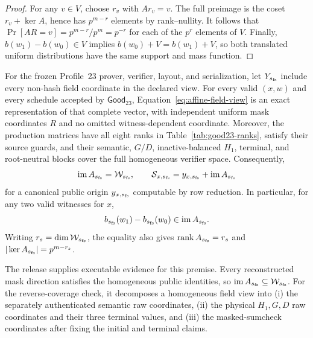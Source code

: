 \begin{proof}
For any \(v\in V\), choose \(r_v\) with \(Ar_v=v\).  The full preimage is
the coset \(r_v+\ker A\), hence has \(p^{m-r}\) elements by rank--nullity.
It follows that
\(
 \Pr[AR=v]=p^{m-r}/p^m=p^{-r}
\)
for each of the \(p^r\) elements of \(V\).  Finally,
\(b(w_1)-b(w_0)\in V\) implies
\(b(w_0)+V=b(w_1)+V\), so both translated uniform distributions have the
same support and mass function.
\end{proof}

\begin{assumption}
\label{lem:complete-affine-image}
For the frozen Profile~23 prover, verifier, layout, and serialization, let
\(Y_{s_{\rm fs}}\) include every non-hash field coordinate in the declared
view.  For every valid \((x,w)\) and every schedule accepted by
\(\mathsf{Good}_{23}\), Equation~\eqref{eq:affine-field-view} is an exact
representation of that complete vector, with independent uniform mask
coordinates \(R\) and no omitted witness-dependent coordinate.  Moreover, the
production matrices have all eight ranks in Table~\ref{tab:good23-ranks},
satisfy their source guards, and their semantic, \(G/D\), inactive-balanced
\(H_1\), terminal, and root-neutral blocks cover the full homogeneous
verifier space.  Consequently,
\begin{equation}
 \operatorname{im}A_{s_{\rm fs}}=\mathcal W_{s_{\rm fs}},
 \qquad
 \mathcal S_{x,s_{\rm fs}}
 =y_{x,s_{\rm fs}}+\operatorname{im}A_{s_{\rm fs}}
 \label{eq:image-equality}
\end{equation}
for a canonical public origin \(y_{x,s_{\rm fs}}\) computable by row
reduction.  In particular, for any two valid witnesses for \(x\),
\[
b_{s_{\rm fs}}(w_1)-b_{s_{\rm fs}}(w_0)
   \in\operatorname{im}A_{s_{\rm fs}}.
\]
Writing \(r_s=\dim\mathcal W_{s_{\rm fs}}\), the equality also gives
\(\operatorname{rank}A_{s_{\rm fs}}=r_s\) and
\(|\ker A_{s_{\rm fs}}|=p^{m-r_s}\).
\end{assumption}

The release supplies executable evidence for this premise.  Every
reconstructed mask direction satisfies the homogeneous public identities, so
\(\operatorname{im}A_{s_{\rm fs}}\subseteq\mathcal W_{s_{\rm fs}}\).
For the reverse-coverage check, it decomposes a homogeneous field view into
(i) the separately authenticated semantic raw coordinates, (ii) the physical
\(H_1,G,D\) raw coordinates and their three terminal values, and (iii) the
masked-sumcheck coordinates after fixing the initial and terminal claims.

